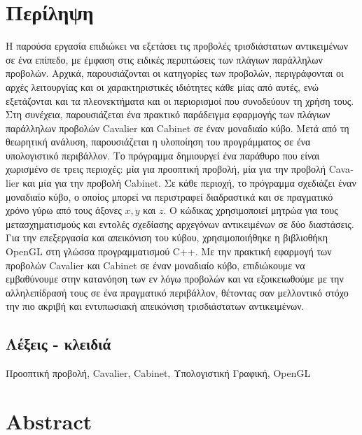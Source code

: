 \chapter*{Περίληψη}

Η παρούσα εργασία επιδιώκει να εξετάσει τις προβολές τρισδιάστατων αντικειμένων σε ένα επίπεδο, με έμφαση στις ειδικές περιπτώσεις των πλάγιων παράλληλων προβολών. Αρχικά, παρουσιάζονται οι κατηγορίες των προβολών, περιγράφονται οι αρχές λειτουργίας και οι χαρακτηριστικές ιδιότητες κάθε μίας από αυτές, ενώ εξετάζονται και τα πλεονεκτήματα και οι περιορισμοί που συνοδεύουν τη χρήση τους. Στη συνέχεια, παρουσιάζεται ένα πρακτικό παράδειγμα εφαρμογής των πλάγιων παράλληλων προβολών \textlatin{Cavalier} και \textlatin{Cabinet} σε έναν μοναδιαίο κύβο.
Μετά από τη θεωρητική ανάλυση, παρουσιάζεται η υλοποίηση του προγράμματος σε ένα υπολογιστικό περιβάλλον. Το πρόγραμμα δημιουργεί ένα παράθυρο που είναι χωρισμένο σε τρεις περιοχές: μία για προοπτική προβολή, μία για την προβολή \textlatin{Cavalier} και μία για την προβολή \textlatin{Cabinet}. Σε κάθε περιοχή, το πρόγραμμα σχεδιάζει έναν μοναδιαίο κύβο, ο οποίος μπορεί να περιστραφεί διαδραστικά και σε πραγματικό χρόνο γύρω από τους άξονες $x, y$ και $z$. Ο κώδικας χρησιμοποιεί μητρώα για τους μετασχηματισμούς και εντολές σχεδίασης αρχεγόνων αντικειμένων σε δύο διαστάσεις. Για την επεξεργασία και απεικόνιση του κύβου, χρησιμοποιήθηκε η βιβλιοθήκη \textlatin{OpenGL} στη γλώσσα προγραμματισμού \textlatin{C++}. Με την πρακτική εφαρμογή των προβολών \textlatin{Cavalier} και \textlatin{Cabinet} σε έναν μοναδιαίο κύβο, επιδιώκουμε να εμβαθύνουμε στην κατανόηση των εν λόγω προβολών και να εξοικειωθούμε με την αλληλεπίδρασή τους σε ένα πραγματικό περιβάλλον, θέτοντας σαν μελλοντικό στόχο την πιο ακριβή και εντυπωσιακή απεικόνιση τρισδιάστατων αντικειμένων. 
\vspace{1.5em}

\section*{Λέξεις - κλειδιά}
Προοπτική προβολή, \textlatin{Cavalier}, \textlatin{Cabinet}, Υπολογιστική Γραφική, \textlatin{OpenGL}

\newpage

\chapter*{\textlatin{Abstract}}

